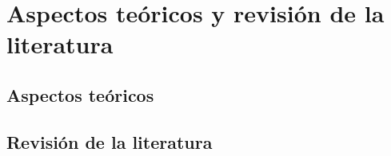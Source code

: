 \chapter{Aspectos teóricos y revisión de la literatura}
\section{Aspectos teóricos}
\section{Revisión de la literatura}
